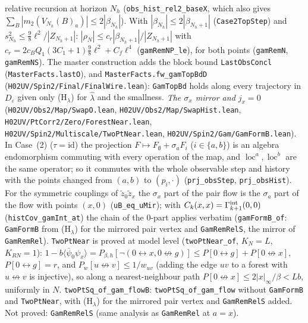 \documentclass[11pt]{amsart}
\theoremstyle{definition}
\theoremstyle{remark}
\numberwithin{equation}{section}
\newcommand{\avg}[1]{\langle #1\rangle}
\begin{document}
relative recursion at horizon $N_h$ (\texttt{obs\_hist\_rel2\_baseX}, which also gives $\sum_B|m_2(V_{N_h}(B)_a)|\le2|\beta_{N_h}|$). With
$|\beta_{N_h}|\le2|\beta_{N_h+1}|$ (\texttt{Case2TopStep}) and $s_{N_h}^2\le\frac98\ell^2/|Z_{N_h+1}|$: $|\rho_N|\le c_r|\beta_{N_h+1}|/|Z_{N_h+1}|$ with
$c_r=2c_BQ_1(3C_1+1)\frac98\ell^2+C_f\ell^4$ (\texttt{gamRemNP\_le}), for both points (\texttt{gamRemN}, \texttt{gamRemNS}).
The master construction adds the block bound \texttt{LastObsConcl} (\texttt{MasterFacts.lastO}), and
\texttt{MasterFacts.fw\_gamTopBdD} (\texttt{H02UV/Spin2/Final/FinalWire.lean}): \texttt{GamTopBd} holds along every trajectory in $D_\varepsilon$ given only (H$_\lambda$) for $\hat\lambda$ and the smallness.
\emph{The $\sigma_x$ mirror and $j_x=0$} (\texttt{H02UV/Obs2/Map/SwapO.lean}, \texttt{H02UV/Obs2/Map/SwapHist.lean}, \texttt{H02UV/PtCorr2/Zero/ForestNear.lean},
\texttt{H02UV/Spin2/Multiscale/TwoPtNear.lean}, \texttt{H02UV/Spin2/Gam/GamFormB.lean}). In Case~(2) ($\tau=\mathrm{id}$) the projection $F\mapsto F_\emptyset+\sigma_aF_i$ ($i\in\{a,b\}$)
is an algebra endomorphism commuting with every operation of the map, and $\operatorname{loc}^a,\operatorname{loc}^b$ are the same operator; so it
commutes with the whole observable step and history with the points changed from $(a,b)$ to $(p_i,\cdot)$ (\texttt{prj\_obsStep},
\texttt{prj\_obsHist}). For the symmetric couplings of $\tilde z_0\tilde z_x$ the $\sigma_x$ part of the pair flow is the $\sigma_a$ part of the flow
with points $(x,0)$ (\texttt{uB\_eq\_uMir}); with $C_k(x,x)=\Gamma^{\rm int}_{k+1}(0,0)$ (\texttt{histCov\_gamInt\_at}) the chain of the $0$-part applies
verbatim (\texttt{gamFormB\_of}: \texttt{GamFormB} from (H$_\lambda$) for the mirrored pair vertex and \texttt{GamRemRelS}, the mirror of \texttt{GamRemRel}).
\texttt{TwoPtNear} is proved at model level (\texttt{twoPtNear\_of}, $K_N=L$, $K_{RN}=1$): $1-b\avg{\bar\psi_0\psi_x}=P_{\beta,h}[\neg(0\leftrightarrow x,0\not\leftrightarrow g)]
\le P[0\leftrightarrow g]+P[0\not\leftrightarrow x]$, $P[0\leftrightarrow g]=r$, and $P_w[u\not\leftrightarrow v]\le 1/w_{uv}$ (adding the edge $uv$ to a forest
with $u\not\leftrightarrow v$ is injective), so along a nearest-neighbour path $P[0\not\leftrightarrow x]\le2|x|_\infty/\beta<Lb$, uniformly in $N$.
\texttt{twoPtSq\_of\_gam\_flowB}: \texttt{twoPtSq\_of\_gam\_flow} without \texttt{GamFormB} and \texttt{TwoPtNear}, with (H$_\lambda$) for the mirrored pair
vertex and \texttt{GamRemRelS} added. Not proved: \texttt{GamRemRelS} (same analysis as \texttt{GamRemRel} at $a=x$).
\end{document}
